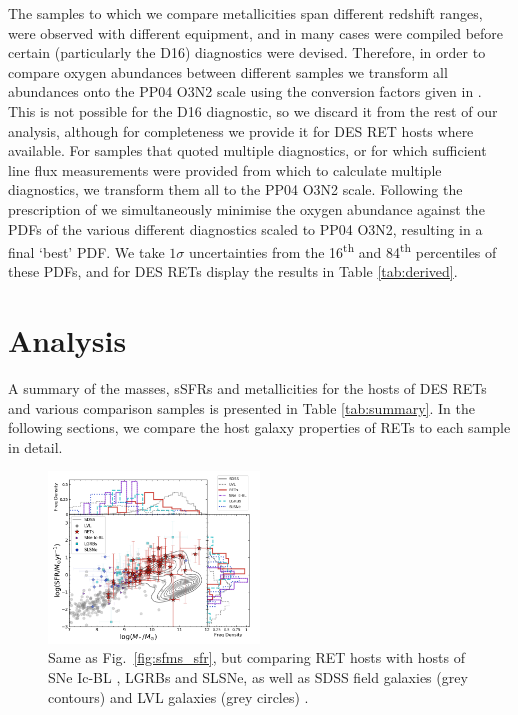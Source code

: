 \documentclass[fleqn,usenatbib,]{mnras}
\newcommand{\replyref}[1]{\color{magenta}#1 \color{black}}
\begin{document}
The samples to which we compare metallicities span different redshift ranges, were observed with different equipment, and in many cases were compiled before certain (particularly the D16) diagnostics were devised. Therefore, in order to compare oxygen abundances between different samples we transform all abundances onto the PP04 O3N2 scale using the conversion factors given in \citet{Kewley2008}. This is not possible for the D16 diagnostic, so we discard it from the rest of our analysis, although for completeness we provide it for DES RET hosts where available. For samples that quoted multiple diagnostics, or for which sufficient line flux measurements were provided from which to calculate multiple diagnostics, we transform them all to the PP04 O3N2 scale. Following the prescription of \citet{Kruehler2015} we simultaneously minimise the oxygen abundance against the PDFs of the various different diagnostics scaled to PP04 O3N2, resulting in a final `best' PDF. We take $1\sigma$ uncertainties from the 16\textsuperscript{th} and 84\textsuperscript{th} percentiles of these PDFs, and for DES RETs display the results in Table \ref{tab:derived}.


\section{Analysis}
\label{sec:analysis} %
A summary of the masses, sSFRs and metallicities for the hosts of DES RETs and various comparison samples is presented in Table \ref{tab:summary}. In the following sections, we compare the host galaxy properties of RETs to each sample in detail.


\begin{figure}
\includegraphics[width=0.5\textwidth]{figs/SFR_Mike_Other.png}
\caption{Same as Fig.~\ref{fig:sfms_sfr}, but comparing RET hosts with hosts of \replyref{SNe Ic-BL}, LGRBs and SLSNe, as well as SDSS field galaxies (grey contours) and \replyref{LVL galaxies (grey circles)}.
\label{fig:sfms_sfr_other}}
\end{figure}
\end{document}
